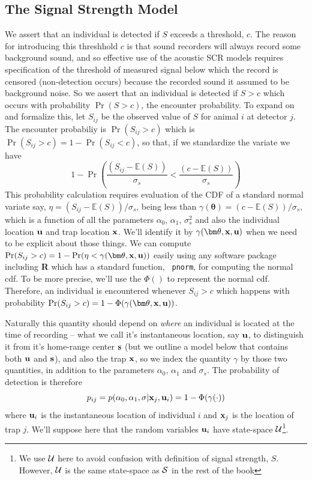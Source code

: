 \subsection{The Signal Strength Model}

We assert that an individual is detected if $S$ exceeds a threshold,
$c$. The reason for introducing this threshhold $c$ is that sound
recorders will always record some
background 
sound, and so effective use of the
acoustic SCR models requires specification of the threshold of
measured signal below which the record is censored (non-detection
occurs) because the recorded sound it assumed to be background noise.
So we assert that an individual is detected if $S>c$ which occurs with
probability $\Pr(S > c)$, the encounter probability.  To expand on and
formalize this, let $S_{ij}$ be the observed value of $S$ for animal $i$ at
detector $j$.  The encounter probabiliy is $\Pr(S_{ij}>c)$ which is
$\Pr(S_{ij}>c) = 1- \Pr(S_{ij} < c)$, so that, if we standardize the
variate we have
\[
1-\Pr\left( \frac{ (S_{ij}- \mathbb{E}(S))}{\sigma_{s}}  <  \frac{
(c -  \mathbb{E}(S)) }{\sigma_{s}} \right)
\]
This probability %
calculation requires evaluation of the CDF  of a standard normal variate
say, $\eta = (S_{ij}- \mathbb{E}(S))/\sigma_{s}$, being
less than 
$\gamma({\bm \theta}) = (c -  \mathbb{E}(S))/\sigma_{s}$, 
which is a function of all the parameters $\alpha_{0}$, $\alpha_{1}$,
$\sigma_{s}^{2}$ and also the individual location ${\bf u}$ and trap location
${\bf x}$.
We'll identify it by
$\gamma({\bm \theta},{\bf x},{\bf u})$ when we need to be explicit
about those things.
 We can compute
$\Pr(S_{ij}>c) = 1-\Pr(  \eta <
\gamma({\bm \theta}, {\bf x},{\bf u}))$ easily using any software
package including {\bf R} which has a standard function, \mbox{\tt
  pnorm}, for computing the normal cdf.
To be more precise, we'll use the $\Phi()$ to represent the normal
cdf. Therefore, an individual is encountered whenever $S_{ij}>c$ which
happens with probability
$\Pr(S_{ij}>c) = 1-\Phi( \gamma({\bm \theta}, {\bf x},{\bf u}) )$.

Naturally this quantity should depend on {\it where} an individual is
located at the time of recording
-- what we call it's instantaneous location, say ${\bf u}$, to
distinguish it from it's
 home-range center ${\bf s}$ (but we outline a model below that
 contains both ${\bf u}$ and ${\bf s}$),
and also the trap ${\bf x}$, so we
 index the quantity $\gamma$ by those two quantities, in
addition to the parameters $\alpha_{0}$, $\alpha_{1}$ and $\sigma_{s}$.
The probability of detection is therefore
\[
p_{ij} = p(\alpha_0, \alpha_1, \sigma | {\bf x}_{j}, {\bf u}_{i} ) = 1- \Phi( \gamma(\cdot))
\]
where
 ${\bf u}_{i}$ is the instantaneous location of individual $i$ and
${\bf x}_{j}$ is the location of trap $j$.  We'll suppose here that
the random variables ${\bf u}_{i}$ have state-space ${\cal
  U}$\footnote{We use ${\cal U}$ here to avoid confusion with
  definition of signal strength, $S$. However, ${\cal U}$ is the same
  state-space as ${\cal S}$ in the rest of the book}.

